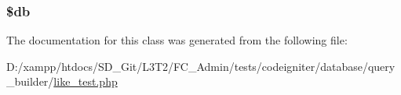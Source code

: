 \subsubsection[{\$db}]{\setlength{\rightskip}{0pt plus 5cm}\$db\hspace{0.3cm}{\ttfamily [protected]}}\label{class_like__test_a1fa3127fc82f96b1436d871ef02be319}


The documentation for this class was generated from the following file\+:\begin{DoxyCompactItemize}
\item 
D\+:/xampp/htdocs/\+S\+D\+\_\+\+Git/\+L3\+T2/\+F\+C\+\_\+\+Admin/tests/codeigniter/database/query\+\_\+builder/\hyperlink{like__test_8php}{like\+\_\+test.\+php}\end{DoxyCompactItemize}
